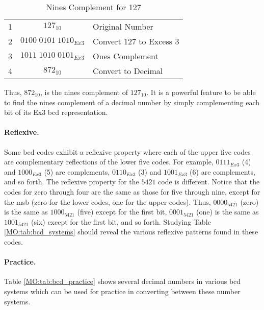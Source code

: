 \begin{table}[H]
  \sffamily
  \newcommand{\head}[1]{\textcolor{white}{\textbf{#1}}}    
  \begin{center}
    \begin{tabular}{ c | c l } 
      \hline
      1 & $ 127_{10} $ & {Original Number} \\
      2 & $ 0100 \; 0101 \; 1010_{Ex3} $ & {Convert 127 to Excess 3} \\
      3 & $ 1011 \; 1010 \; 0101_{Ex3} $ & {Ones Complement} \\
      4 & $ 872_{10} $ & {Convert to Decimal} \\
      \hline  
    \end{tabular}
  \end{center}
  \caption{Nines Complement for 127}
  \label{MO:tab:nines_complement}
\end{table}

Thus, $ 872_{10} $, is the nines complement of $ 127_{10} $. It is a powerful feature to be able to find the nines complement of a decimal number by simply complementing each bit of its Ex3 \gls{bcd} representation. 

\paragraph{Reflexive.} Some \gls{bcd} codes exhibit a reflexive property where each of the upper five codes are complementary reflections of the lower five codes. For example, $ 0111_{Ex3} $ (4) and $ 1000_{Ex3} $ (5) are complements, $ 0110_{Ex3} $ (3) and $ 1001_{Ex3} $ (6) are complements, and so forth. The reflexive property for the $ 5421 $ code is different. Notice that the codes for zero through four are the same as those for five through nine, except for the \gls{msb} (zero for the lower codes, one for the upper codes). Thus, $ 0000_{5421} $ (zero) is the same as $ 1000_{5421} $ (five) except for the first bit, $ 0001_{5421} $ (one) is the same as $ 1001_{5421} $ (six) except for the first bit, and so forth. Studying Table \ref{MO:tab:bcd_systems} should reveal the various reflexive patterns found in these codes.

\paragraph{Practice.} Table \ref{MO:tab:bcd_practice} shows several decimal numbers in various \gls{bcd} systems which can be used for practice in converting between these number systems.

